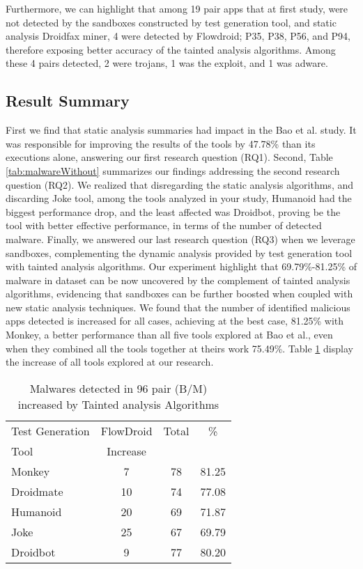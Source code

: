 Furthermore, we can highlight that among 19 pair apps that at first study, were not detected by the sandboxes constructed by test generation tool, and static analysis Droidfax miner, 4 were detected by Flowdroid; P35, P38, P56, and P94, therefore exposing better accuracy of the tainted analysis algorithms. Among these 4 pairs detected, 2 were trojans, 1 was the exploit, and 1 was adware.

\subsection{Result Summary}

First we find that static analysis summaries had impact in the Bao et al. study. It was responsible for improving the results of the tools by 47.78\% than its executions alone, answering our first research question (RQ1). Second, Table \ref{tab:malwareWithout} summarizes our findings addressing the second research question (RQ2). We realized that disregarding the static analysis algorithms, and discarding Joke tool, among the tools analyzed in your study, Humanoid had the biggest performance drop, and the least affected was Droidbot, proving be the tool with better effective performance, in terms of the number of detected malware. Finally, we answered our last research question (RQ3) when we leverage sandboxes, complementing the dynamic analysis provided by test generation tool with tainted analysis algorithms. Our experiment highlight that 69.79\%-81.25\% of malware in dataset can be now uncovered by the complement of tainted analysis algorithms, evidencing that 
sandboxes can be further boosted when coupled with new static analysis techniques. We found that the number of identified malicious apps detected is increased for all cases, achieving at the best case, 81.25\% with Monkey, a better performance than all five tools explored at Bao et al., even when they combined all the tools together at theirs work 75.49\%. Table \ref{tab:tanted} display the increase of all tools explored at our research.

\begin{table}[ht]
\centering
\begin{tabular}{lccc}\toprule
 Test Generation & FlowDroid & Total & \%\\
 Tool & Increase  &  & \\ \midrule
 Monkey & 7 & 78 & 81.25\\
 Droidmate & 10 &  74 & 77.08 \\
 Humanoid & 20 & 69 & 71.87  \\
 Joke & 25 & 67 & 69.79 \\
 Droidbot & 9 & 77 & 80.20  \\\midrule
 
\end{tabular} 
\caption{Malwares detected in 96 pair (B/M) increased by Tainted analysis Algorithms}
\label{tab:tanted}
\end{table}



